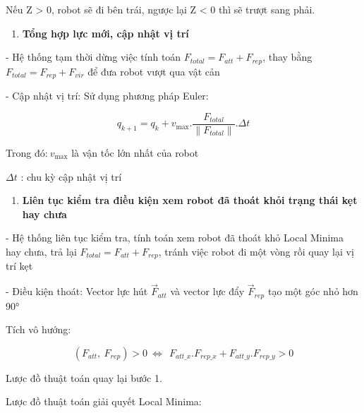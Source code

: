 \documentclass[12pt,a4paper,oneside]{report}
\begin{document}
Nếu Z \textgreater{} 0, robot sẽ đi bên trái, ngược lại Z \textless{} 0 thì sẽ trượt sang phải.

\begin{enumerate}
\def\labelenumi{\arabic{enumi}.}
\setcounter{enumi}{2}
\item
  \textbf{Tổng hợp lực mới, cập nhật vị trí}
\end{enumerate}

- Hệ thống tạm thời dừng việc tính toán \(F_{total} = F_{att} + F_{rep}\), thay bằng \(F_{total} = F_{rep} + F_{vir}\) để đưa robot vượt qua vật cản

- Cập nhật vị trí: Sử dụng phương pháp Euler:

\[q_{k + 1} = q_{k} + v_{\max}.\frac{F_{total}}{\left\| F_{total} \right\|}.\Delta t\]

Trong đó:\(\ v_{\max}\) là vận tốc lớn nhất của robot

\(\Delta t\) : chu kỳ cập nhật vị trí

\begin{enumerate}
\def\labelenumi{\arabic{enumi}.}
\setcounter{enumi}{3}
\item
  \textbf{Liên tục kiểm tra điều kiện xem robot đã thoát khỏi trạng thái kẹt hay chưa}
\end{enumerate}

- Hệ thống liên tục kiểm tra, tính toán xem robot đã thoát khỏ Local Minima hay chưa, trả lại \(F_{total} = F_{att} + F_{rep}\), tránh việc robot đi một vòng rồi quay lại vị trí kẹt

- Điều kiện thoát: Vector lực hút \({\overrightarrow{F}}_{att}\) và vector lực đẩy \({\overrightarrow{F}}_{rep}\) tạo một góc nhỏ hơn 90°

Tích vô hướng:

\[\left( F_{att},\ F_{rep} \right) > 0\  \Leftrightarrow \ \ F_{att\_ x}.F_{rep\_ x} + F_{att\_ y}.F_{rep\_ y} > 0\]

Lược đồ thuật toán quay lại bước 1.

Lược đồ thuật toán giải quyết Local Minima:
\end{document}
